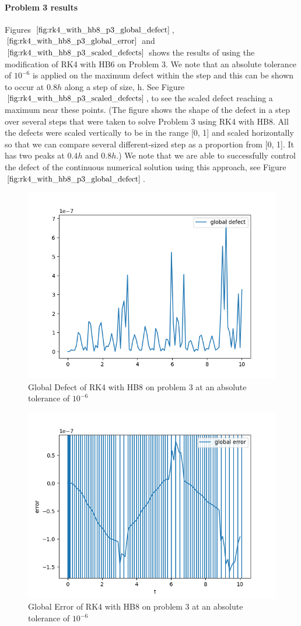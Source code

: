 \documentclass{article}
\begin{document}
\paragraph{Problem 3 results}
Figures $\ref{fig:rk4_with_hb8_p3_global_defect}$, $\ref{fig:rk4_with_hb8_p3_global_error}$ and $\ref{fig:rk4_with_hb8_p3_scaled_defects}$ shows the results of using the modification of RK4 with HB6 on Problem 3. 
We note that an absolute tolerance of $10^{-6}$ is applied on the maximum defect within the step and this can be shown to occur at $0.8h$ along a step of size, h.  See Figure $\ref{fig:rk4_with_hb8_p3_scaled_defects}$, to see the scaled defect reaching a maximum near these points. (The figure shows the shape of the defect in a step over several steps that were taken to solve Problem 3 using RK4 with HB8. All the defects were scaled vertically to be in the range [0, 1] and scaled horizontally so that we can compare several different-sized step as a proportion from [0, 1]. It has two peaks at $0.4h$ and $0.8h$.) We note that we are able to successfully control the defect of the continuous numerical solution using this approach, see Figure $\ref{fig:rk4_with_hb8_p3_global_defect}$. 

\begin{figure}[H]
\centering
\includegraphics[width=0.7\linewidth]{./figures/rk4_with_hb8_p3_global_defect}
\caption{Global Defect of RK4 with HB8 on problem 3 at an absolute tolerance of $10^{-6}$}
\label{fig:rk4_with_hb8_p3_global_defect}
\end{figure}

\begin{figure}[H]
\centering
\includegraphics[width=0.7\linewidth]{./figures/rk4_with_hb8_p3_global_error}
\caption{Global Error of RK4 with HB8 on problem 3 at an absolute tolerance of $10^{-6}$}
\label{fig:rk4_with_hb8_p3_global_error}
\end{figure}
\end{document}
